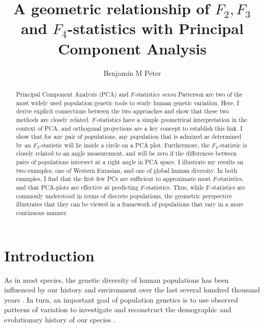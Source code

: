 \documentclass[12pt,fullpage, a4paper]{article}
\title{A geometric relationship of $F_2, F_3$ and $F_4$-statistics with Principal Component Analysis}
\author{Benjamin M Peter}
\begin{document}
	\maketitle
\begin{abstract}
Principal Component Analysis (PCA) and $F$-statistics \textit{sensu} Patterson are two of the most widely used population genetic tools to study human genetic variation. Here, I derive explicit connections between the two approaches and  show that these two methods are closely related. $F$-statistics have a simple geometrical interpretation in the context of PCA, and orthogonal projections are a key concept to establish this link. 
I show that for any pair of populations, any population that is admixed as determined by an $F_3$-statistic will lie inside a circle on a PCA plot. Furthermore, the $F_4$-statistic is closely related to an angle measurement, and will be zero if the differences between pairs of populations intersect at a right angle in PCA space. 
I illustrate my results on two examples, one of Western Eurasian, and one of global human diversity. In both examples, I find that the first few PCs are sufficient to approximate most $F$-statistics, and that PCA-plots are effective at predicting $F$-statistics. Thus, while F-statistics are commonly understood in terms of discrete populations, the geometric perspective illustrates that they can be viewed in a framework of populations that vary in a more continuous manner.
\end{abstract}
\section{Introduction}
As in most species, the genetic diversity of human populations has been influenced by our history and environment over the last several hundred thousand years \citep[e.g][]{cavalli-sforza1994,marciniak2017, reich2018a, nielsen2017, witt2022}. In turn, an important goal of population genetics is to use observed patterns of variation to  investigate and reconstruct the demographic and evolutionary history of our species \citep{schraiber2015, orlando2021}. 
\end{document}
